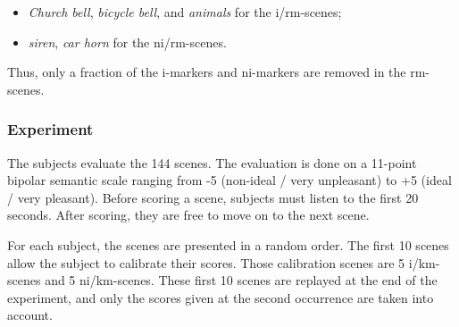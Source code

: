 \documentclass[twoside,twocolumn]{article}
\begin{document}

\begin{itemize}
\item \emph{Church bell}, \emph{bicycle bell}, and \emph{animals} for the i/rm-scenes;
\item \emph{siren}, \emph{car horn} for the ni/rm-scenes.
\end{itemize}


Thus, only a fraction of the i-markers and ni-markers are removed in the rm-scenes.

\subsubsection*{Experiment}




The subjects evaluate the 144 scenes. The evaluation is done on a 11-point bipolar semantic scale ranging from -5 (non-ideal / very unpleasant) to +5 (ideal / very pleasant). Before scoring a scene, subjects must listen to the first 20 seconds. After scoring, they are free to move on to the next scene.

For each subject, the scenes are presented in a random order. The first 10 scenes allow the subject to calibrate their scores. Those calibration scenes are  5 i/km-scenes and 5 ni/km-scenes. These first 10 scenes are replayed at the end of the experiment, and only the scores given at the second occurrence are taken into account.
\end{document}
